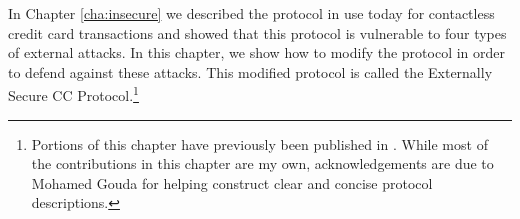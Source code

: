 In Chapter \ref{cha:insecure} we described the protocol in use today for contactless credit card transactions
    and showed that this protocol is vulnerable to four types of external attacks.
In this chapter, we show how to modify the protocol in order to defend against these attacks.
This modified protocol is called the Externally Secure CC Protocol.\footnote{
        Portions of this chapter have previously been published in \cite{jensen1}.
        While most of the contributions in this chapter are my own,
        acknowledgements are due to Mohamed Gouda for helping construct clear and concise protocol descriptions.
}
